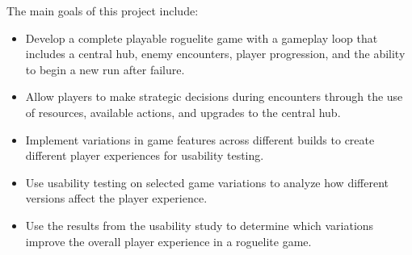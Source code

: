 The main goals of this project include:

\begin{itemize}

    \item Develop a complete playable roguelite game with a gameplay loop that includes a central hub, enemy encounters, player progression, and the ability to begin a new run after failure.

    \item Allow players to make strategic decisions during encounters through the use of resources, available actions, and upgrades to the central hub. 

    \item Implement variations in game features across different builds to create different player experiences for usability testing. 

    \item Use usability testing on selected game variations to analyze how different versions affect the player experience.

    \item Use the results from the usability study to determine which variations improve the overall player experience in a roguelite game.

\end{itemize}
